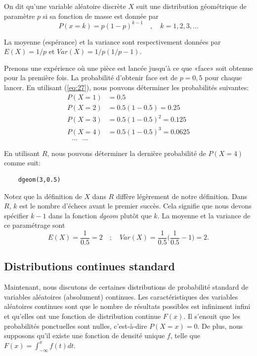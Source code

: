 {\theoremstyle{definition}
\begin{definition}
    On dit qu'une variable aléatoire discrète $X$ suit une distribution géométrique de paramètre $p$ si sa
    fonction de masse est donnée par
    \begin{equation}\label{eq:27}
        P(x=k)=p(1-p)^{k-1} \quad\mathrm{  ,  }\quad k=1,2,3,\dots
    \end{equation}
\end{definition}
La moyenne (espérance) et la variance sont respectivement données par $E (X) = 1/p$ et $Var (X) = 1/p (1/p  -  1)$.
\begin{example}
Prenons une expérience où une pièce est lancée jusqu'à ce que  «face» soit obtenue pour la première fois.
La probabilité d'obtenir face est de $p = 0,5$ pour chaque lancer. En utilisant (\ref{eq:27}),
nous pouvons déterminer les probabilités suivantes:
    \begin{align*}
        P(X=1) &=0.5\\
        P(X=2) &=0.5(1-0.5)=0.25\\
        P(X=3) &=0.5(1-0.5)^2=0.125\\
        P(X=4) &=0.5(1-0.5)^3=0.0625\\
        \text{       }\dots \text{    }  \dots
    \end{align*}
\end{example}
En utilisant $R$, nous pouvons déterminer la dernière probabilité de $P(X = 4)$ comme suit:
\begin{verbatim}
    dgeom(3,0.5)
\end{verbatim}
Notez que la définition de $X$ dans $R$ diffère légèrement de notre définition. Dans $R$, $k$ est le nombre d'échecs
avant le premier succès. Cela signifie que nous devons spécifier $k - 1$ dans la fonction \emph{dgeom} plutôt que $k$.
La moyenne et la variance de ce paramétrage sont
$$E(X)=\frac{1}{0.5}=2\quad\mathrm{;    }\quad Var(X)=\frac{1}{0.5}\bigg(\frac{1}{0.5}-1\bigg) =2.     $$

\subsection{Distributions continues standard}

Maintenant, nous discutons de certaines distributions de probabilité standard de variables aléatoires (absolument)
continues. Les caractéristiques des variables aléatoires continues sont que le nombre de résultats possibles est
infiniment infini et qu’elles ont une fonction de distribution continue $F(x)$. Il s'ensuit que les probabilités
ponctuelles sont nulles, c'est-à-dire $P(X = x) = 0$. De plus, nous supposons qu'il existe une fonction de densité
unique $f$, telle que $F(x)= \int_{-\infty}^{x}f(t)dt$.

}
